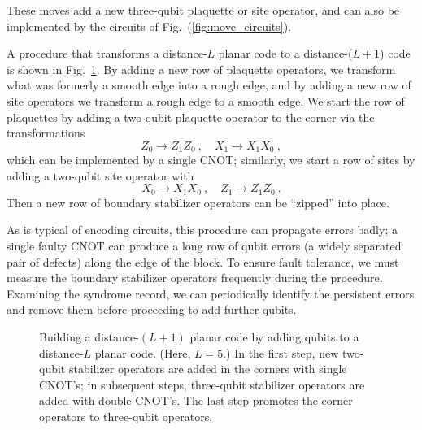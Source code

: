 \noindent These moves add a new three-qubit plaquette or site operator, and
can also be implemented by the circuits of Fig.~(\ref{fig:move_circuits}).

A procedure that transforms a distance-$L$ planar code to a distance-($L+1$)
code is shown in Fig.~\ref{fig:build_up}.
By adding a new row of plaquette operators, we transform what was formerly a smooth edge into a rough edge, and by adding a new row of site operators we transform a rough edge to a smooth edge. We start the row of plaquettes by adding a two-qubit plaquette operator to the corner via the transformations 
\begin{equation}
Z_0 \to Z_1 Z_0~, \quad X_1\to X_1 X_0 ~, 
\end{equation}
which can be implemented by a single CNOT;
similarly, we start a row of sites by adding a two-qubit site operator with 
\begin{equation}
X_0 \to X_1 X_0~, \quad Z_1\to Z_1 Z_0 ~. 
\end{equation}
Then  a new row of boundary stabilizer operators can be ``zipped'' into place.

As is typical of encoding circuits, this procedure can propagate errors badly;
a single faulty CNOT can produce a long row of qubit errors (a widely separated
pair of defects) along the edge of the block.  To ensure fault tolerance, we
must measure the boundary stabilizer operators frequently during the procedure.
 Examining the syndrome record, we can periodically identify the persistent
errors and remove them before proceeding to add further qubits.

\begin{figure}
\begin{center}
\leavevmode
\epsfxsize=4in
\end{center}
\caption{Building a distance-$(L+1)$ planar code by adding qubits to a
distance-$L$ planar code. (Here, $L=5$.) In the first
step,  new two-qubit stabilizer operators are added in the corners with
single CNOT's; in subsequent steps, three-qubit stabilizer operators are added
with double CNOT's. The last step promotes the corner operators to three-qubit
operators.}
\label{fig:build_up}
\end{figure}


